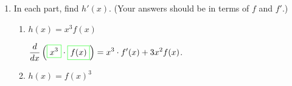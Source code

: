 \documentclass{article}
\begin{document}
\begin{enumerate}
\begin{enumerate}
    \item
      \begin{problem}[\vfill\newpage]
       $j(x)=\sqrt{x^2+5x}$
      \end{problem}

      \begin{solution}
        We begin by rewriting $j(x) = (x^2+5x)^{1/2}$. We apply the Chain Rule to find:
        $$j'(x)=\frac{1}{2}\cdot (x^2+5x)^{-1/2}\cdot (2x+5)$$
      \end{solution}

    \item %

    \begin{problem}[\vfill]
     $k(x)=\sqrt{(x^2+5x)(x+4)^2}$

    \end{problem}

    \begin{solution}
      We begin by rewriting $k(x)=((x^2+5x)(x+4)^2)^{1/2}$. We apply the Chain Rule to find the derivative. Because of the complexity of what's under the radical, we'll need both the product rule and the Chain Rule to compute the derivative of those functions:
      $$k'(x)=\frac{1}{2}((x^2+5x)(x+4)^2)^{-1/2}\cdot[(2x+5)\cdot (x+4)^2+(x^2+5x)(2(x+4))]$$
    \end{solution}

    

    \end{enumerate}

      \item
   In each part, find $h'(x)$.  (Your answers should be in terms of $f$
  and $f'$.)

    \begin{enumerate}[topsep=0pt]
    \item
      \begin{problem}[\vfill]
        $h(x) = x^3 f(x)$
      \end{problem}

      \begin{solution}
        $\displaystyle \frac{d}{dx}
        \left(\fcolorbox{green}{white}{$\displaystyle x^ { 3} $}\cdot
          \fcolorbox{green}{white}{$\displaystyle f(x)$}\right)
        = {} x^ { 3} \cdot f'(x)+ 3 x^ { 2} f(x)$.
      \end{solution}

    \item
      \begin{problem}[\vfill]
        $h(x) = f(x)^3$
      \end{problem}


\end{enumerate}
\end{enumerate}
\end{document}
